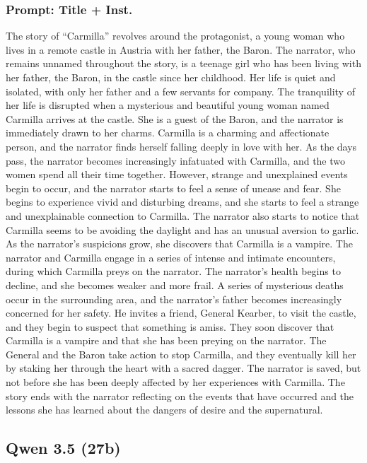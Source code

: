 \documentclass{article} %
\begin{document}
\subsubsection{Prompt: Title + Inst.}

The story of ``Carmilla'' revolves around the protagonist, a young woman who lives in a remote castle in Austria with her father, the Baron. The narrator, who remains unnamed throughout the story, is a teenage girl who has been living with her father, the Baron, in the castle since her childhood. Her life is quiet and isolated, with only her father and a few servants for company. The tranquility of her life is disrupted when a mysterious and beautiful young woman named Carmilla arrives at the castle. She is a guest of the Baron, and the narrator is immediately drawn to her charms. Carmilla is a charming and affectionate person, and the narrator finds herself falling deeply in love with her. As the days pass, the narrator becomes increasingly infatuated with Carmilla, and the two women spend all their time together. However, strange and unexplained events begin to occur, and the narrator starts to feel a sense of unease and fear. She begins to experience vivid and disturbing dreams, and she starts to feel a strange and unexplainable connection to Carmilla. The narrator also starts to notice that Carmilla seems to be avoiding the daylight and has an unusual aversion to garlic. As the narrator's suspicions grow, she discovers that Carmilla is a vampire. \textcolor{skipred}{The narrator and Carmilla engage in a series of intense and intimate encounters, during which Carmilla preys on the narrator.} The narrator's health begins to decline, and she becomes weaker and more frail. A series of mysterious deaths occur in the surrounding area, and the narrator's father becomes increasingly concerned for her safety. He invites a friend, General Kearber, to visit the castle, and they begin to suspect that something is amiss. They soon discover that Carmilla is a vampire and that she has been preying on the narrator. The General and the Baron take action to stop Carmilla, and they eventually kill her by staking her through the heart with a sacred dagger. \textcolor{skipred}{The narrator is saved, but not before she has been deeply affected by her experiences with Carmilla.} The story ends with the narrator reflecting on the events that have occurred and the lessons she has learned about the dangers of desire and the supernatural.


\subsection{Qwen 3.5 (27b)}
\end{document}
